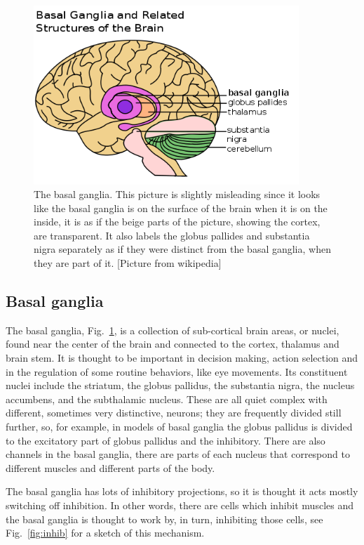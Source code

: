 \documentclass[11pt,a4paper]{scrartcl}
\begin{document}
\begin{figure}
\begin{center}
\includegraphics[width=10cm]{basal_ganglia_wikipedia.png}%
\end{center}
\caption{The basal ganglia. This picture is slightly misleading since
  it looks like the basal ganglia is on the surface of the brain when
  it is on the inside, it is as if the beige parts of the picture,
  showing the cortex, are transparent. It also labels the globus
  pallides and substantia nigra separately as if they were distinct
  from the basal ganglia, when they are part of it. [Picture from
    wikipedia]\label{fig:basal_ganglia}}
\end{figure}

\subsection*{Basal ganglia}

The basal ganglia, Fig.~\ref{fig:basal_ganglia}, is a collection of
sub-cortical brain areas, or nuclei, found near the center of the
brain and connected to the cortex, thalamus and brain stem. It is
thought to be important in decision making, action selection and in
the regulation of some routine behaviors, like eye movements. Its
constituent nuclei include the striatum, the globus pallidus, the
substantia nigra, the nucleus accumbens, and the subthalamic
nucleus. These are all quiet complex with different, sometimes very
distinctive, neurons; they are frequently divided still further, so,
for example, in models of basal ganglia the globus pallidus is divided
to the excitatory part of globus pallidus and the inhibitory. There
are also channels in the basal ganglia, there are parts of each
nucleus that correspond to different muscles and different parts of
the body.

The basal ganglia has lots of inhibitory projections, so it is thought
it acts mostly switching off inhibition. In other words, there are
cells which inhibit muscles and the basal ganglia is thought to work
by, in turn, inhibiting those cells, see Fig.~\ref{fig:inhib} for a
sketch of this mechanism.
\end{document}
